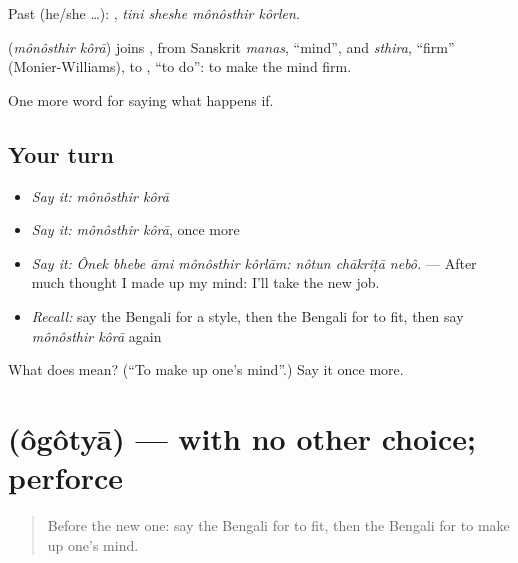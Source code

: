 Past (he/she …):    , \emph{tini sheshe mônôsthir kôrlen}.

\begin{cousinweb}
\textbf{ } (\emph{mônôsthir kôrā}) joins , from Sanskrit \emph{manas}, \textquotedblleft{}mind\textquotedblright{}, and \emph{sthira}, \textquotedblleft{}firm\textquotedblright{} (Monier-Williams), to , \textquotedblleft{}to do\textquotedblright{}: to make the mind firm.
\end{cousinweb}

\begin{grammarlens}[title={What you've built}]
One more word for saying what happens if.
\end{grammarlens}

\subsection*{Your turn}
\begin{itemize}
\raggedright
  \item \emph{Say it:} \emph{mônôsthir kôrā}
  \item \emph{Say it:} \emph{mônôsthir kôrā}, once more
  \item \emph{Say it:} \emph{Ônek bhebe āmi mônôsthir kôrlām: nôtun chākriṭā nebô.} — After much thought I made up my mind: I'll take the new job.
  \item \emph{Recall:} say the Bengali for a style, then the Bengali for to fit, then say \emph{mônôsthir kôrā} again
\end{itemize}

\begin{tcolorbox}[breakable,colback=teal!4,colframe=teal!35!black,title={Before you move on}]
What does   mean? (\textquotedblleft{}To make up one's mind\textquotedblright{}.) Say it once more.
\end{tcolorbox}
\section[\texorpdfstring{\bn{অগত্যা} (ôgôtyā)}{অগত্যা (ôgôtyā)}]{ (ôgôtyā) — with no other choice; perforce}

\label{lesson:BN-C537-ogotya}



\begin{quote}
Before the new one: say the Bengali for to fit, then the Bengali for to make up one's mind.
\end{quote}

